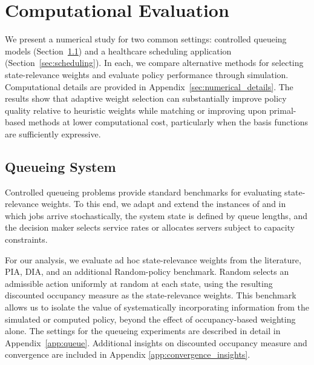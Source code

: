 \documentclass[sglanonrev]{informs4}
\def\edits#1{{\color{black}#1}}
\begin{document}

\section{Computational Evaluation}
\label{sec:numerical_experiments}

\edits{We present a numerical study for two common settings: controlled queueing models (Section~\ref{sec:queueing}) and a healthcare scheduling application (Section~\ref{sec:scheduling}). In each, we compare alternative methods for selecting state-relevance weights and evaluate policy performance through simulation. Computational details are provided in Appendix~\ref{sec:numerical_details}. The results show that adaptive weight selection can substantially improve policy quality relative to heuristic weights while matching or improving upon primal-based methods at lower computational cost, particularly when the basis functions are sufficiently expressive.}

\subsection{Queueing System} 
\label{sec:queueing}
\edits{Controlled queueing problems provide standard benchmarks for evaluating state-relevance weights. To this end, we adapt and extend the instances of \citet{de2003linear} and \citet{de2008choosing} in which jobs arrive stochastically, the system state is defined by queue lengths, and the decision maker selects service rates or allocates servers subject to capacity constraints.}

For our analysis, we evaluate ad hoc state-relevance weights from the literature, \ac{PIA}, \ac{DIA}, and an additional Random-policy benchmark. Random selects an admissible action uniformly at random at each state, using the resulting discounted occupancy measure as the state-relevance weights. This benchmark allows us to isolate the value of systematically incorporating information from the simulated or computed policy, beyond the effect of occupancy-based weighting alone. The settings for the queueing experiments are described in detail in Appendix~\ref{app:queue}. Additional insights on discounted occupancy measure and convergence are included in Appendix \ref{app:convergence_insights}. 
\end{document}
